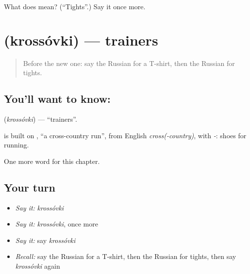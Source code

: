 \begin{tcolorbox}[breakable,colback=teal!4,colframe=teal!35!black,title={Before you move on}]
What does  mean? (\textquotedblleft{}Tights\textquotedblright{}.) Say it once more.
\end{tcolorbox}
\section[\texorpdfstring{\ru{кроссовки} (krossóvki)}{кроссовки (krossóvki)}]{ (krossóvki) — trainers}

\label{lesson:RU-C162-krossovki}



\begin{quote}
Before the new one: say the Russian for a T-shirt, then the Russian for tights.
\end{quote}

\subsection*{You'll want to know: }
\textbf{} (\emph{krossóvki}) — \textquotedblleft{}trainers\textquotedblright{}.

\begin{cousinweb}
\textbf{} is built on \emph{}, \textquotedblleft{}a cross-country run\textquotedblright{}, from English \emph{cross(-country)}, with \emph{-}: shoes for running.
\end{cousinweb}

\begin{grammarlens}[title={What you've built}]
One more word for this chapter.
\end{grammarlens}

\subsection*{Your turn}
\begin{itemize}
\raggedright
  \item \emph{Say it:} \emph{krossóvki}
  \item \emph{Say it:} \emph{krossóvki}, once more
  \item \emph{Say it:} say \emph{krossóvki}
  \item \emph{Recall:} say the Russian for a T-shirt, then the Russian for tights, then say \emph{krossóvki} again
\end{itemize}

